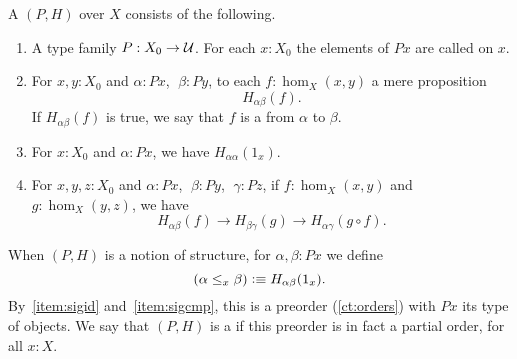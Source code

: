 \documentclass[hott-all.tex]{subfiles}
\begin{document}
%
%

\begin{defn}
  A 
  $(P,H)$ over $X$ consists of the following.
  \begin{enumerate}
  \item A type family $P:X_0 \to \mathcal{U}$.
    For each $x:X_0$ the elements of $Px$ are called 
    on $x$.
  \item For $x,y:X_0$ and $\alpha:Px$, $\;\beta:Py$, to each $f:\hom_X(x,y)$ a mere proposition
  \[ H_{\alpha\beta}(f).\]
    If $H_{\alpha\beta}(f)$ is true, we say that $f$ is a 
    from $\alpha$ to $\beta$.
  \item For $x:X_0$ and $\alpha:Px$, we have $H_{\alpha\alpha}(1_x)$.
  \item For $x,y,z:X_0$ and $\alpha:Px$, $\;\beta:Py$, $\;\gamma:Pz$,
if $f:\hom_X(x,y)$ and $g:\hom_X(y,z)$, we have
  \[ H_{\alpha\beta}(f)\to H_{\beta\gamma}(g)\to H_{\alpha\gamma}(g\circ   f).\]
   \end{enumerate}
  When $(P,H)$ is a notion of structure, for $\alpha,\beta:Px$ we define
  \[ (\alpha\leq_x\beta) \vcentcolon\equiv H_{\alpha\beta}(1_x).\]
  By~\ref{item:sigid} and~\ref{item:sigcmp}, this is a preorder (\cref{ct:orders}) with $Px$ its type of objects.
  We say that $(P,H)$ is a 
  if this preorder is in fact a partial order, for all $x:X$.
\end{defn}
\end{document}
